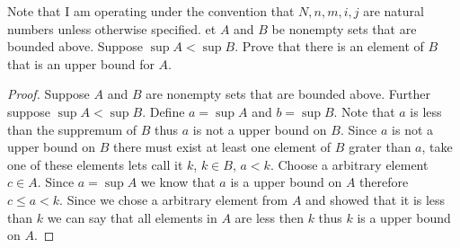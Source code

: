 \documentclass[12pt]{article}
\makeatletter
\theoremstyle{homework}
\newenvironment{exercise}[1]
{\def\@currentlabel{#1}\exercisecore}
{\endexercisecore}
\makeatother
\begin{document}
Note that I am operating under the convention that $N,n,m,i,j$ are natural numbers unless otherwise specified.
\begin{exercise}

Let $A$ and $B$ be nonempty sets that are bounded above. Suppose $\sup A < \sup B$. Prove that there is an element of $B$ that is an upper bound for $A$.
\end{exercise}
\begin{proof}
Suppose $A$ and $B$ are nonempty sets that are bounded above. Further suppose $\sup A < \sup B$. Define $a=\sup A$ and $b=\sup B$.  Note that $a$ is less than the suppremum of $B$ thus $a$ is not a upper bound on $B$.  Since $a$ is not a upper bound on $B$ there must exist at least one element of $B$ grater than $a$, take one of these elements lets call it $k$, $k\in B$, $a<k$.  Choose a arbitrary element $c\in A$.  Since $a=\sup A$ we know that $a$ is a upper bound on $A$ therefore $c\leq a < k$.  Since we chose a arbitrary element from $A$ and showed that it is less than $k$ we can say that all elements in $A$ are less then $k$ thus $k$ is a upper bound on $A$.
\end{proof}
\end{document}
